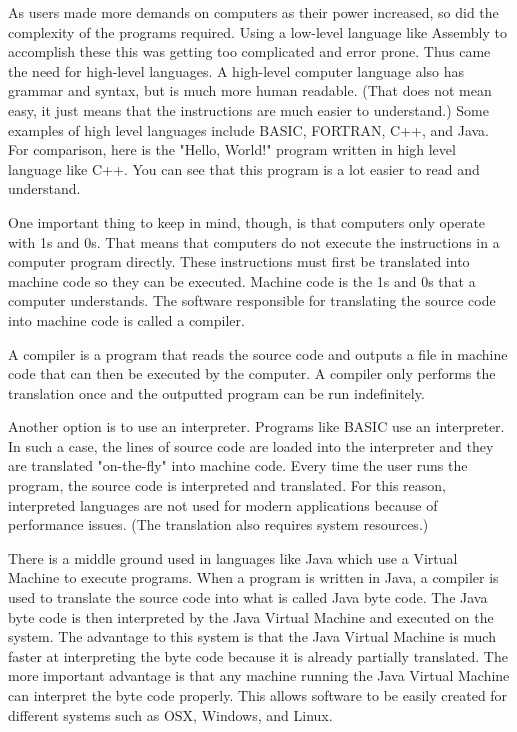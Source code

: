 

As users made more demands on computers as their power increased, so did the complexity of the programs required. Using a low-level language like Assembly to accomplish these this was getting too complicated and error prone. Thus came the need for high-level languages. A high-level computer language also has grammar and syntax, but is much more human readable. (That does not mean easy, it just means that the instructions are much easier to understand.) Some examples of high level languages include BASIC, FORTRAN, C++, and Java.
For comparison, here is the "Hello, World!" program written in high level language like C++. You can see that this program is a lot easier to read and understand.



One important thing to keep in mind, though, is that computers only operate with 1s and 0s. That means that computers do not execute the instructions in a computer program directly. These instructions must first be translated into machine code so they can be executed. Machine code is the 1s and 0s that a computer understands. The software responsible for translating the source code into machine code is called a compiler.

A compiler is a program that reads the source code and outputs a file in machine code that can then be executed by the computer. A compiler only performs the translation once and the outputted program can be run indefinitely.

Another option is to use an interpreter. Programs like BASIC use an interpreter. In such a case, the lines of source code are loaded into the interpreter and they are translated "on-the-fly" into machine code. Every time the user runs the program, the source code is interpreted and translated. For this reason, interpreted languages are not used for modern applications because of performance issues. (The translation also requires system resources.)

There is a middle ground used in languages like Java which use a Virtual Machine to execute programs. When a program is written in Java, a compiler is used to translate the source code into what is called Java byte code. The Java byte code is then interpreted by the Java Virtual Machine and executed on the system. The advantage to this system is that the Java Virtual Machine is much faster at interpreting the byte code because it is already partially translated. The more important advantage is that any machine running the Java Virtual Machine can interpret the byte code properly. This allows software to be easily created for different systems such as OSX, Windows, and Linux.

